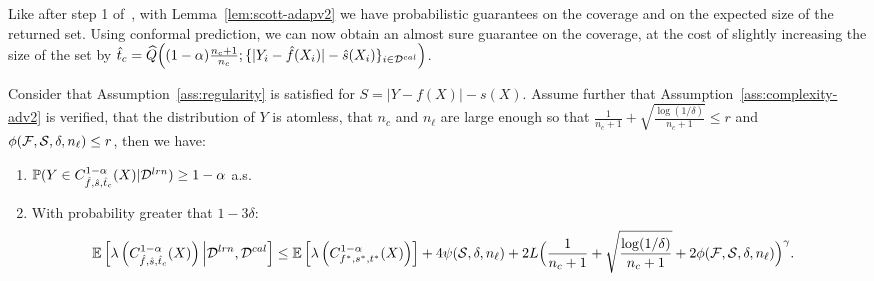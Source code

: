 Like after step 1 of~\method, with Lemma~\ref{lem:scott-adapv2} we have probabilistic guarantees on the coverage and on the expected size of the returned set. Using conformal prediction, we can now obtain an almost sure guarantee on the coverage, at the cost of slightly increasing the size of the set by $\hat{t}_c = \widehat{Q}\Big((1-\alpha)\frac{n_c+1}{n_c};\{|Y_i-\hat{f}(X_i)|-\hat{s}(X_i)\}_{i\in{\cal D}^{cal}}\Big)$.


\begin{theorem}
    \label{thme:main-adap}
    Consider that Assumption~\ref{ass:regularity} is satisfied for $S=|Y-f(X)|-s(X)$. Assume further that Assumption~\ref{ass:complexity-adv2} is verified, that the distribution of $Y$ is atomless, that $n_c$ and $n_\ell$ are large enough so that $\frac{1}{n_c+1} +\sqrt{\frac{\log(1/\delta)}{n_c+1}}\leq r $ and ${\phi(\mathcal{F},{\cal S},\delta,n_\ell)}\leq r$, then we have:
    \begin{enumerate}[leftmargin=*]
        \item ${\mathbb{P}}(Y\in C_{\hat{f},\hat{s},\hat{t}_c}^{1-\alpha}(X)|{\cal D}^{lrn})\geq 1-\alpha$ a.s. %
        \item With probability greater that $1-3\delta$:
        \begin{equation}
            \label{eq:thme-adap}
            \hspace{-0.3cm}\EE\left[\lambda\left(C_{\hat{f},\hs,\hat{t}_c}^{1-\alpha}(X)\right)\Big|\calD^{lrn},\calD^{cal}\right] \leq \EE\left[\lambda\left(C_{f^*,s^*,t^*}^{1-\alpha}(X)\right)\right] + 4\psiSl + 2L\Big(\frac{1}{n_c+1}+\sqrt{\frac{\log(1/\delta)}{n_c+1}} + 2\phiFSl\Big)^\gamma.
        \end{equation}
    \end{enumerate}
\end{theorem}


